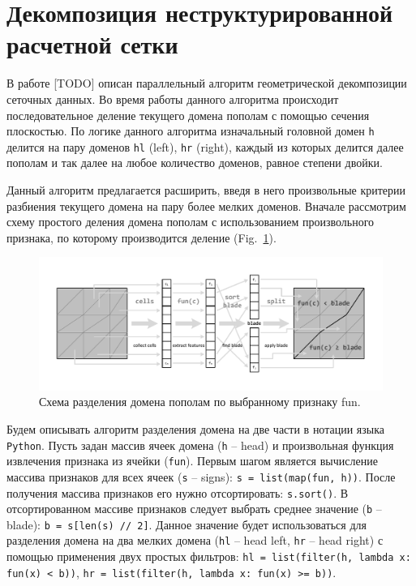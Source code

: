 \documentclass[
11pt,%
tightenlines,%
twoside,%
onecolumn,%
nofloats,%
nobibnotes,%
nofootinbib,%
superscriptaddress,%
noshowpacs,%
centertags]%
{revtex4}
\begin{document}
\section{Декомпозиция неструктурированной расчетной сетки}

В работе [TODO] описан параллельный алгоритм геометрической декомпозиции сеточных данных.
Во время работы данного алгоритма происходит последовательное деление текущего домена пополам с помощью сечения плоскостью.
По логике данного алгоритма изначальный головной домен \texttt{h} делится на пару доменов \texttt{hl} (left), \texttt{hr} (right), каждый из которых делится далее пополам и так далее на любое количество доменов, равное степени двойки.

Данный алгоритм предлагается расширить, введя в него произвольные критерии разбиения текущего домена на пару более мелких доменов.
Вначале рассмотрим схему простого деления домена пополам с использованием произвольного признака, по которому производится деление (Fig.~\ref{fig:03-split}).

\begin{figure}[h]
\includegraphics[width=1.0\textwidth]{pics/03-split.pdf}
\caption{Схема разделения домена пополам по выбранному признаку fun.}\label{fig:03-split}
\end{figure}

Будем описывать алгоритм разделения домена на две части в нотации языка \texttt{Python}.
Пусть задан массив ячеек домена (\texttt{h} -- head) и произвольная функция извлечения признака из ячейки (\texttt{fun}).
Первым шагом является вычисление массива признаков для всех ячеек (\texttt{s} -- signs): \texttt{s = list(map(fun, h))}.
После получения массива признаков его нужно отсортировать: \texttt{s.sort()}.
В отсортированном массиве признаков следует выбрать среднее значение (\texttt{b} -- blade): \texttt{b = s[len(s) // 2]}.
Данное значение будет использоваться для разделения домена на два мелких домена (\texttt{hl} -- head left, \texttt{hr} -- head right) с помощью применения двух простых фильтров: \texttt{hl = list(filter(h, lambda x: fun(x) < b))}, \texttt{hr = list(filter(h, lambda x: fun(x) >= b))}.
\end{document}
